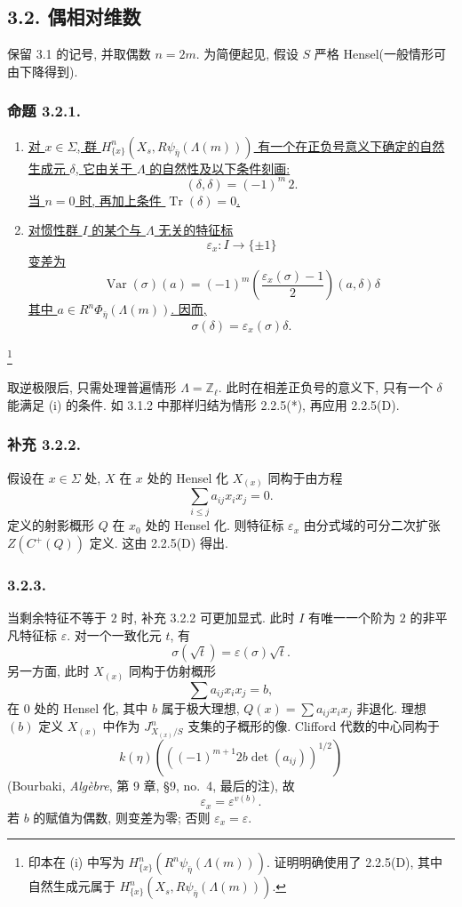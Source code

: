 \subsection*{3.2. 偶相对维数}

保留 3.1 的记号, 并取偶数 $n=2m$. 为简便起见, 假设 $S$ 严格 Hensel(一般情形可由下降得到).

\subsubsection*{命题 3.2.1.}
\begin{enumerate}
\item[(i)] \underline{对 $x\in\Sigma$, 群 $H^n_{\{x\}}(X_s,R\psi_{\bar\eta}(\Lambda(m)))$ 有一个在正负号意义下确定的自然生成元 $\delta$, 它由关于 $\Lambda$ 的自然性及以下条件刻画:}
\[
(\delta,\delta)=(-1)^m\,2.
\]
\underline{当 $n=0$ 时, 再加上条件 $\operatorname{Tr}(\delta)=0$.}

\item[(ii)] \underline{对惯性群 $I$ 的某个与 $\Lambda$ 无关的特征标}
\[
\varepsilon_x:I\longrightarrow\{\pm1\}
\]
\underline{变差为}
\[
\operatorname{Var}(\sigma)(a)
=(-1)^m\left(\frac{\varepsilon_x(\sigma)-1}{2}\right)
(a,\delta)\delta
\]
\underline{其中 $a\in R^n\Phi_{\bar\eta}(\Lambda(m))$. 因而,}
\[
\sigma(\delta)=\varepsilon_x(\sigma)\delta.
\]
\end{enumerate}
\footnote{印本在 (i) 中写为 $H^n_{\{x\}}(R^n\psi_{\bar\eta}(\Lambda(m)))$. 证明明确使用了 2.2.5(D), 其中自然生成元属于 $H^n_{\{x\}}(X_s,R\psi_{\bar\eta}(\Lambda(m)))$.}

取逆极限后, 只需处理普遍情形 $\Lambda=\mathbb Z_\ell$. 此时在相差正负号的意义下, 只有一个 $\delta$ 能满足 (i) 的条件. 如 3.1.2 中那样归结为情形 2.2.5(*), 再应用 2.2.5(D).

\subsubsection*{补充 3.2.2.}
假设在 $x\in\Sigma$ 处, $X$ 在 $x$ 处的 Hensel 化 $X_{(x)}$ 同构于由方程
\[
\sum_{i\leq j}a_{ij}x_ix_j=0.
\]
定义的射影概形 $Q$ 在 $x_0$ 处的 Hensel 化. 则特征标 $\varepsilon_x$ 由分式域的可分二次扩张 $Z(C^+(Q))$ 定义. 这由 2.2.5(D) 得出.

\subsubsection*{3.2.3.}
当剩余特征不等于 $2$ 时, 补充 3.2.2 可更加显式. 此时 $I$ 有唯一一个阶为 $2$ 的非平凡特征标 $\varepsilon$. 对一个一致化元 $t$, 有
\[
\sigma(\sqrt t)=\varepsilon(\sigma)\sqrt t.
\]
另一方面, 此时 $X_{(x)}$ 同构于仿射概形
\[
\sum a_{ij}x_ix_j=b,
\]
在 $0$ 处的 Hensel 化, 其中 $b$ 属于极大理想, $Q(x)=\sum a_{ij}x_ix_j$ 非退化. 理想 $(b)$ 定义 $X_{(x)}$ 中作为 $J^n_{X_{(x)}/S}$ 支集的子概形的像. Clifford 代数的中心同构于
\[
k(\eta)\left(\left((-1)^{m+1}2b\det(a_{ij})\right)^{1/2}\right)
\]
(Bourbaki, \emph{Alg\`ebre}, 第 9 章, \S9, no.~4, 最后的注), 故
\[
\varepsilon_x=\varepsilon^{v(b)}.
\]
若 $b$ 的赋值为偶数, 则变差为零; 否则 $\varepsilon_x=\varepsilon$.